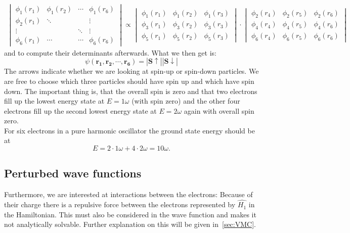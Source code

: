 \begin{align}
\begin{vmatrix}
\phi_1(r_1) & \phi_1(r_2) & \cdots & \phi_1(r_6)\\
\phi_2(r_1) & \ddots & &\vdots \\
\vdots & & \ddots& \vdots\\
\phi_6(r_1) & \cdots & \cdots & \phi_6(r_6)
\end{vmatrix}
\propto
\begin{vmatrix}
\phi_1(r_1)& \phi_1(r_2)& \phi_1(r_3)\\
\phi_3(r_1)& \phi_3(r_2)& \phi_3(r_3)\\
\phi_5(r_1)& \phi_5(r_2)& \phi_5(r_3)
\end{vmatrix}
\cdot
\begin{vmatrix}
\phi_2(r_4)& \phi_2(r_5)& \phi_2(r_6)\\
\phi_4(r_4)& \phi_4(r_5)& \phi_4(r_6)\\
\phi_6(r_4)& \phi_6(r_5)& \phi_6(r_6)
\end{vmatrix}
\end{align} 
and to compute their determinants afterwards. What we then get is:
\begin{equation}
\psi(\mathbf{r_1,r_2,\cdots, r_6})= |\mathbf{S\uparrow}||\mathbf{S\downarrow}|
\end{equation}
The arrows indicate whether we are looking at spin-up or spin-down particles. We are free to choose which three particles should have spin up and which have spin down. The important thing is, that the overall spin is zero and that two electrons fill up the lowest energy state at $E=1\omega$ (with spin zero) and the other four electrons fill up the second lowest energy state at $E=2\omega$ again with overall spin zero.\\
For six electrons in a pure harmonic oscillator the ground state energy should be at
\begin{equation}
E = 2 \cdot 1\omega + 4 \cdot 2\omega = 10\omega.
\end{equation}
\subsection{Perturbed wave functions}
Furthermore, we are interested at interactions between the electrons: Because of their charge there is a repulsive force between the electrons represented by $\hat{H_1}$ in the Hamiltonian. This must also be considered in the wave function and makes it not analytically solvable. Further explanation on this will be given in~\ref{sec:VMC}.
